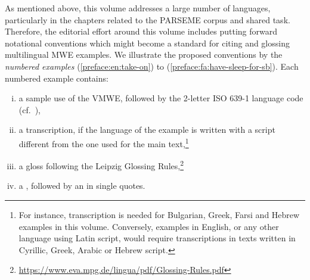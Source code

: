 \documentclass[output=paper,
modfonts,
]{langscibook}
\begin{document}
 As mentioned above, this volume addresses a large number of languages, particularly in the chapters related to the PARSEME corpus and shared task. Therefore, the editorial effort around this volume includes putting forward notational conventions which might become a standard for citing and glossing multilingual MWE examples.
We illustrate the proposed conventions by the \emph{numbered examples}  (\ref{preface:en:take-on}) to (\ref{preface:fa:have-sleep-for-sb}). Each numbered example contains:%
\begin{enumerate}[(i)]%
\item\label{ex-line:use} a sample use of the VMWE, followed by the 2-letter ISO 639-1 language code (cf.~),

\item\label{ex-line:transcription} a transcription, if the language of the example is written with a script different from the one used for the main text,\footnote{For instance, transcription is needed for Bulgarian, Greek, Farsi and Hebrew examples in this volume. Conversely, examples in English, or any other language using Latin script, would require transcriptions %
in texts written in Cyrillic, Greek, Arabic or Hebrew script.}


\item\label{ex-line:gloss} a gloss %
following 
the Leipzig Glossing Rules,\footnote{\url{https://www.eva.mpg.de/lingua/pdf/Glossing-Rules.pdf}} 

\item\label{ex-line:trans} a , followed by an  in single quotes. 
\end{enumerate}
\end{document}
